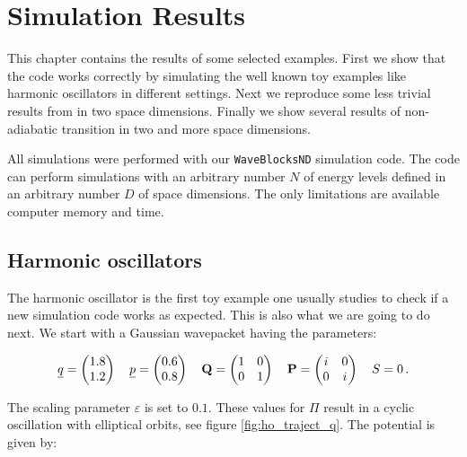 \chapter{Simulation Results}


This chapter contains the results of some selected examples.
First we show that the code works correctly by simulating
the well known toy examples like harmonic oscillators in different
settings. Next we reproduce some less trivial results from \cite{FGL_semiclassical_dynamics}
in two space dimensions. Finally we show several results of non-adiabatic
transition in two and more space dimensions.

All simulations were performed with our \texttt{WaveBlocksND} simulation
code\cite{waveblocksnd}. The code can perform simulations with an arbitrary
number $N$ of energy levels defined in an arbitrary number $D$ of space
dimensions. The only limitations are available computer memory and time.


\section{Harmonic oscillators}


The harmonic oscillator is the first toy example one usually studies to
check if a new simulation code works as expected. This is also what we
are going to do next. We start with a Gaussian wavepacket having the
parameters:

\begin{align*}
  \underline{q} = \begin{pmatrix}
              1.8 \\ 1.2
            \end{pmatrix}
  \quad
  \underline{p} = \begin{pmatrix}
              0.6 \\ 0.8
            \end{pmatrix}
  \quad
  \mathbf{Q} = \begin{pmatrix}
              1 & 0 \\ 0 & 1
            \end{pmatrix}
  \quad
  \mathbf{P} = \begin{pmatrix}
              i & 0 \\ 0 & i
            \end{pmatrix}
  \quad
  S = 0 \,.
\end{align*}

The scaling parameter $\varepsilon$ is set to $0.1$. These values for $\Pi$
result in a cyclic oscillation with elliptical orbits, see figure \ref{fig:ho_traject_q}.
The potential is given by:

